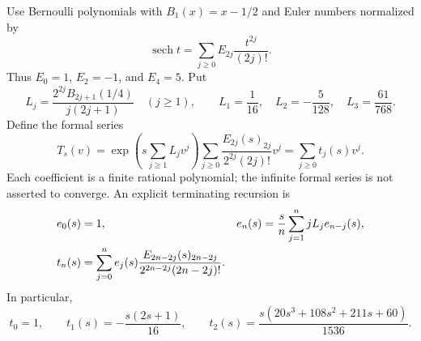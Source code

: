 \documentclass[11pt,letterpaper]{article}
\numberwithin{equation}{section}
\theoremstyle{definition}
\theoremstyle{remark}
\begin{document}
Use Bernoulli polynomials with $B_1(x)=x-1/2$ and Euler numbers normalized by
\[
 \operatorname{sech}t=\sum_{j\ge0}E_{2j}\frac{t^{2j}}{(2j)!}.
\]
Thus $E_0=1$, $E_2=-1$, and $E_4=5$. Put
\begin{equation}\label{ct:Lj}
 L_j=\frac{2^{2j}B_{2j+1}(1/4)}{j(2j+1)}\quad(j\ge1),
 \qquad L_1=\frac1{16},\quad L_2=-\frac5{128},\quad L_3=\frac{61}{768}.
\end{equation}
Define the formal series
\begin{equation}\label{ct:Tformal}
 T_s(v)=\exp\left(s\sum_{j\ge1}L_jv^j\right)
       \sum_{j\ge0}\frac{E_{2j}(s)_{2j}}{2^{2j}(2j)!}v^j
       =\sum_{j\ge0}t_j(s)v^j.
\end{equation}
Each coefficient is a finite rational polynomial; the infinite formal
series is not asserted to converge. An explicit terminating recursion is
\begin{align}
 e_0(s)&=1,&
 e_n(s)&=\frac{s}{n}\sum_{j=1}^n jL_je_{n-j}(s),\label{ct:recursion}\\
 t_n(s)&=\sum_{j=0}^ne_j(s)
       \frac{E_{2n-2j}(s)_{2n-2j}}{2^{2n-2j}(2n-2j)!}.\notag
\end{align}
In particular,
\begin{equation}\label{ct:first-t}
 t_0=1,\qquad t_1(s)=-\frac{s(2s+1)}{16},\qquad
 t_2(s)=\frac{s(20s^3+108s^2+211s+60)}{1536}.
\end{equation}
\end{document}
